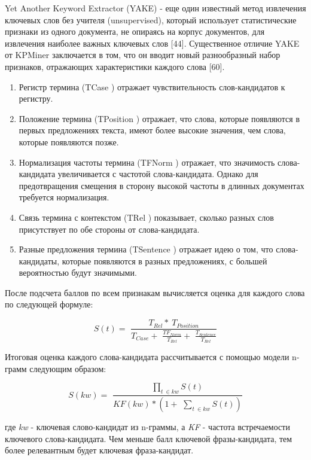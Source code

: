\documentclass[bachelor, och, diploma ]{SCWorks}
\begin{document}
Yet Another Keyword Extractor (YAKE) - еще один известный метод извлечения ключевых слов без учителя (unsupervised), который использует статистические признаки из одного документа, не опираясь на корпус документов, для извлечения наиболее важных ключевых слов [44]. Существенное отличие YAKE от KPMiner  заключается в том, что он вводит новый разнообразный набор признаков, отражающих характеристики каждого слова [60]. 
\begin{enumerate}
    \item Регистр термина (TCase ) отражает чувствительность слов-кандидатов к регистру.
    \item Положение термина (TPosition ) отражает, что слова, которые появляются в первых предложениях текста, имеют более высокие значения, чем слова, которые появляются позже.
    \item Нормализация частоты термина (TFNorm ) отражает, что значимость слова-кандидата увеличивается с частотой слова-кандидата. Однако для предотвращения смещения в сторону высокой частоты в длинных документах требуется нормализация. 
    \item Связь термина с контекстом (TRel ) показывает, сколько разных слов присутствует по обе стороны от слова-кандидата.
    \item Разные предложения термина (TSentence ) отражает идею о том, что слова-кандидаты, которые появляются в разных предложениях, с большей вероятностью будут значимыми.
\end{enumerate}   

После подсчета баллов по всем признакам вычисляется оценка для каждого слова по следующей формуле:

\begin{equation*} S\left ({t}\right)=\,\,\frac {T_{Rel}\ast ~T_{Position}}{T_{Case}+\,\,\frac {TF_{Norm}}{T_{Rel}}+\,\,\frac {T_{Sentence}}{T_{Rel}}} \tag{8}\end{equation*}

Итоговая оценка каждого слова-кандидата рассчитывается с помощью модели n-грамм следующим образом:

\begin{equation*} S\left ({kw}\right)=\,\,\frac {\prod _{t~\in k w}{S(t)}}{KF\left ({kw}\right)\ast \left({1+\,\,\sum _{t~\in k w} S\left ({t}\right)}\right)} \tag{9}\end{equation*}

где \textit{kw} - ключевая слово-кандидат из n-граммы, а \textit{KF} - частота встречаемости ключевого слова-кандидата. Чем меньше балл ключевой фразы-кандидата, тем более релевантным будет ключевая фраза-кандидат.
\end{document}
